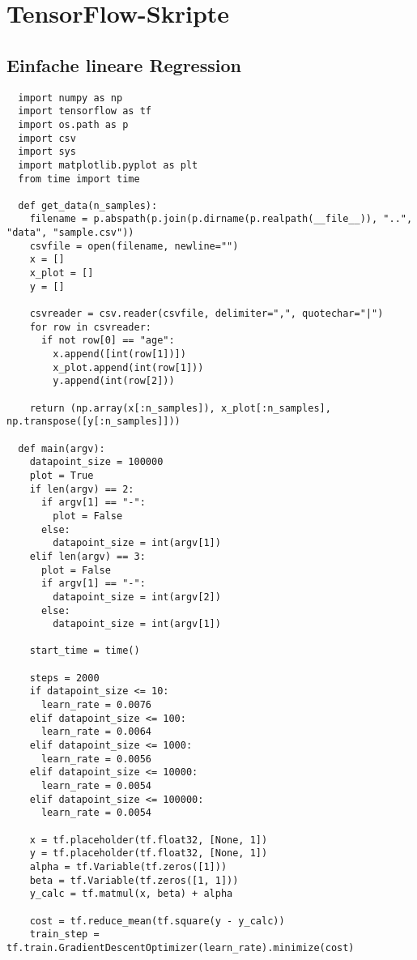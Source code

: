 \chapter{TensorFlow-Skripte}
\label{appendix:C}

\section{Einfache lineare Regression}
\label{appendix:C:1}

\begin{verbatim}
  import numpy as np
  import tensorflow as tf
  import os.path as p
  import csv
  import sys
  import matplotlib.pyplot as plt
  from time import time

  def get_data(n_samples):
    filename = p.abspath(p.join(p.dirname(p.realpath(__file__)), "..", "data", "sample.csv"))
    csvfile = open(filename, newline="")
    x = []
    x_plot = []
    y = []

    csvreader = csv.reader(csvfile, delimiter=",", quotechar="|")
    for row in csvreader:
      if not row[0] == "age":
        x.append([int(row[1])])
        x_plot.append(int(row[1]))
        y.append(int(row[2]))

    return (np.array(x[:n_samples]), x_plot[:n_samples], np.transpose([y[:n_samples]]))

  def main(argv):
    datapoint_size = 100000
    plot = True
    if len(argv) == 2:
      if argv[1] == "-":
        plot = False
      else:
        datapoint_size = int(argv[1])
    elif len(argv) == 3:
      plot = False
      if argv[1] == "-":
        datapoint_size = int(argv[2])
      else:
        datapoint_size = int(argv[1])

    start_time = time()

    steps = 2000
    if datapoint_size <= 10:
      learn_rate = 0.0076
    elif datapoint_size <= 100:
      learn_rate = 0.0064
    elif datapoint_size <= 1000:
      learn_rate = 0.0056
    elif datapoint_size <= 10000:
      learn_rate = 0.0054
    elif datapoint_size <= 100000:
      learn_rate = 0.0054

    x = tf.placeholder(tf.float32, [None, 1])
    y = tf.placeholder(tf.float32, [None, 1])
    alpha = tf.Variable(tf.zeros([1]))
    beta = tf.Variable(tf.zeros([1, 1]))
    y_calc = tf.matmul(x, beta) + alpha

    cost = tf.reduce_mean(tf.square(y - y_calc))
    train_step = tf.train.GradientDescentOptimizer(learn_rate).minimize(cost)


\end{verbatim}
